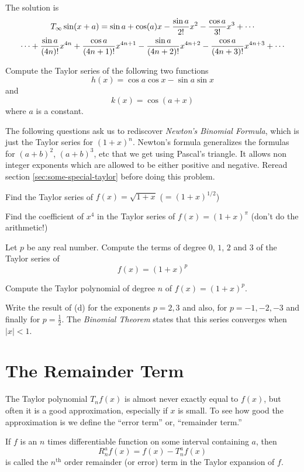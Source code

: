 \begin{multicols}{2}
The solution is
\begin{multline*}
  T_{\infty} \sin(x+a) =
  \sin a + \cos(a) x - \frac{\sin a}{2!}x^2 - \frac{\cos a}{3!}x^3+\cdots \\
  \cdots + \frac{\sin a}{(4n)!}x^{4n} + \frac{\cos
  a}{(4n+1)!}x^{4n+1} - \frac{\sin a}{(4n+2)!}x^{4n+2} - \frac{\cos
  a}{(4n+3)!}x^{4n+3}+ \cdots
\end{multline*}
\endanswer

\problem \groupproblem  Compute the Taylor series of the following two functions %
\[
h(x) = \cos a\cos x - \sin a\sin x
\]
and
\[
k(x) = \cos (a+x)
\]
where $a$ is a constant.

\problem\label{pblm:Newton-Binomial} \groupproblem  The following questions ask %
us to
rediscover \emph{Newton's Binomial Formula}, which is just the Taylor
series for $(1+x)^n$.  Newton's formula generalizes the formulas for
$(a+b)^2$, $(a+b)^3$, etc that we  get using Pascal's triangle. It
allows non integer exponents which are allowed to be either positive
and negative.  Reread section \ref{sec:some-special-taylor} before
doing this problem.


\subprob Find the Taylor series of $f(x) = \sqrt{1+x}$ ($= (1+x)^{1/2}$)


\subprob Find the coefficient of $x^4$ in the Taylor series of $f(x) =
(1+x)^{\pi}$ (don't do the arithmetic!)


\subprob Let $p$ be any real number. Compute the terms of degree $0$, $1$,
$2$ and $3$ of the Taylor series of
\[
f(x) = (1+x)^p
\]


\subprob Compute the Taylor polynomial of degree $n$ of $f(x) = (1+x)^p$.


\subprob Write the result of (d) for the exponents $p=2,3$ and also, for
$p=-1,-2,-3$ and finally for $p=\frac12$.  The \emph{Binomial Theorem}
states that this series converges when $|x|<1$.

\end{multicols}
\noproblemfont

\section{The Remainder Term} \label{sec:Taylor+remainder} The Taylor %
polynomial $T_nf(x)$ is almost never exactly equal to $f (x)$, but often it
is a good approximation, especially if $x$ is small. To see how good the
approximation is we define the ``error term'' or, ``remainder term.''
\begin{definition}
  If $f $ is an $n$ times differentiable function on some interval
  containing $a$, then
  \[
  R_n^af(x) = f(x) - T_n^af(x)
  \]
  is called the $n^{\text{th}}$ order remainder (or error) term in the
  Taylor expansion of $f$.
\end{definition}

